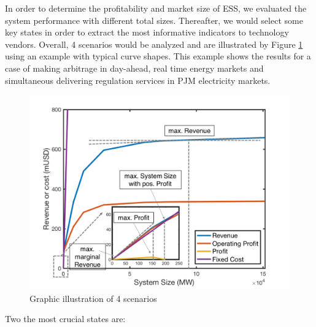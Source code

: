 In order to determine the profitability and market size of ESS, we evaluated the system performance with different total sizes. Thereafter, we would select some key states in order to extract the most informative indicators to technology vendors. Overall, 4 scenarios would be analyzed and are illustrated by Figure \ref{fig:scenario-illustration} using an example with typical curve shapes. This example shows the results for a case of making arbitrage in day-ahead, real time energy markets and simultaneous delivering regulation services in PJM electricity markets. 
\begin{figure}[h!]
	\centering
	\includegraphics[width=0.95\linewidth]{Figures/Scenario_illustration}
	\caption{Graphic illustration of 4 scenarios}
	\label{fig:scenario-illustration}
\end{figure}

Two the most crucial states are:

